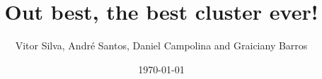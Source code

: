 \documentclass[notitlepage]{report}
\title{Out best, the best cluster ever!}
\author{Vitor Silva, Andr\'e Santos, Daniel Campolina and Graiciany Barros}
\date{\today}
\begin{document}
\maketitle
\thispagestyle{empty}

\begin{abstract}

\end{abstract}
\end{document}
